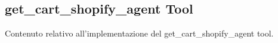 \subsection{get\_cart\_shopify\_agent Tool}

Contenuto relativo all'implementazione del get\_cart\_shopify\_agent tool.
